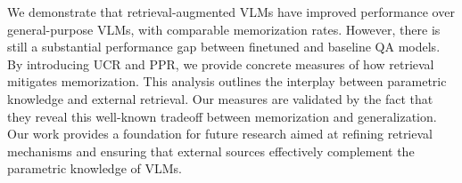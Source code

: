 We demonstrate that retrieval-augmented VLMs have improved performance over general-purpose VLMs, with comparable memorization rates. However, there is still a substantial performance gap between finetuned and baseline QA models. By introducing UCR and PPR, we provide concrete measures of how retrieval mitigates memorization. This analysis outlines the interplay between parametric knowledge and external retrieval. Our measures are validated by the fact that they reveal this well-known tradeoff between memorization and generalization. Our work provides a foundation for future research aimed at refining retrieval mechanisms and ensuring that external sources effectively complement the parametric knowledge of VLMs.






